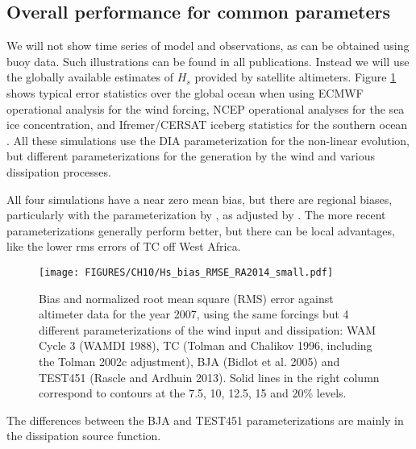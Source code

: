 \subsection{Overall performance for common parameters}
We will not show time series of model and observations, as can  be obtained using buoy data. Such illustrations 
can be found in all publications. Instead we will use the globally available estimates of $H_s$ provided by 
satellite altimeters. 
Figure \ref{fig:global_err1} shows typical error statistics over the global ocean when using ECMWF 
operational analysis for the wind forcing, NCEP operational analyses for the sea ice concentration, 
and Ifremer/CERSAT iceberg statistics for the southern ocean \citep{Tournadre&al.2012}. All these simulations use 
the DIA parameterization for the non-linear evolution, but different parameterizations for the generation by the wind 
and various dissipation processes. 

All four simulations have a near zero mean bias, but there are regional biases, particularly  
with the parameterization by \cite{Tolman&Chalikov1996}, as adjusted by \cite{Tolman2002e}. The more recent 
parameterizations generally perform better, but there can be local advantages, like the lower rms errors of TC off 
West Africa. 
\begin{figure}[htb]
\noindent \begin{centering}
  \texttt{[image: FIGURES/CH10/Hs\_bias\_RMSE\_RA2014\_small.pdf]}
\par\end{centering}

\caption{Bias and normalized root mean square (RMS) error against altimeter data for the year 2007, using the same forcings but 4 different 
parameterizations of the wind input and dissipation: WAM Cycle 3 (WAMDI 1988), TC (Tolman and Chalikov 1996, including the Tolman 2002c
adjustment), 
BJA (Bidlot et al. 2005) and TEST451  (Rascle and Ardhuin 2013). Solid lines in the right column correspond to contours at the 7.5, 10, 12.5, 15 and 20\% levels. } 
\label{fig:global_err1}       %
\end{figure}
The differences between the BJA and TEST451 parameterizations are mainly in the dissipation source function. 

